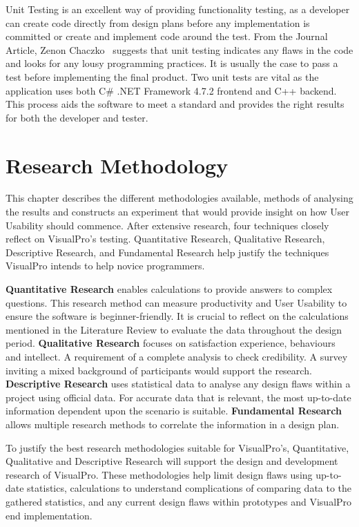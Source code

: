 \documentclass[12pt]{report} %
\begin{document}
		Unit Testing is an excellent way of providing functionality testing, as a developer can create code directly from design plans before any implementation is committed or create and implement code around the test. From the Journal Article, Zenon Chaczko~\cite{chaczko_design_2014} suggests that unit testing indicates any flaws in the code and looks for any lousy programming practices. It is usually the case to pass a test before implementing the final product. Two unit tests are vital as the application uses both C\# .NET Framework 4.7.2 frontend and C++ backend. This process aids the software to meet a standard and provides the right results for both the developer and tester.
		
\chapter{Research Methodology}
\label{chap:researchMethodology}
	This chapter describes the different methodologies available, methods of analysing the results and constructs an experiment that would provide insight on how User Usability should commence. After extensive research, four techniques closely reflect on VisualPro's testing. Quantitative Research, Qualitative Research, Descriptive Research, and Fundamental Research help justify the techniques VisualPro intends to help novice programmers.

	\textbf{Quantitative Research} enables calculations to provide answers to complex questions. This research method can measure productivity and User Usability to ensure the software is beginner-friendly. It is crucial to reflect on the calculations mentioned in the Literature Review to evaluate the data throughout the design period. \textbf{Qualitative Research} focuses on satisfaction experience, behaviours and intellect. A requirement of a complete analysis to check credibility. A survey inviting a mixed background of participants would support the research. \textbf{Descriptive Research} uses statistical data to analyse any design flaws within a project using official data. For accurate data that is relevant, the most up-to-date information dependent upon the scenario is suitable. \textbf{Fundamental Research} allows multiple research methods to correlate the information in a design plan.

	To justify the best research methodologies suitable for VisualPro's, Quantitative, Qualitative and Descriptive Research will support the design and development research of VisualPro. These methodologies help limit design flaws using up-to-date statistics, calculations to understand complications of comparing data to the gathered statistics, and any current design flaws within prototypes and VisualPro end implementation.
\end{document}
